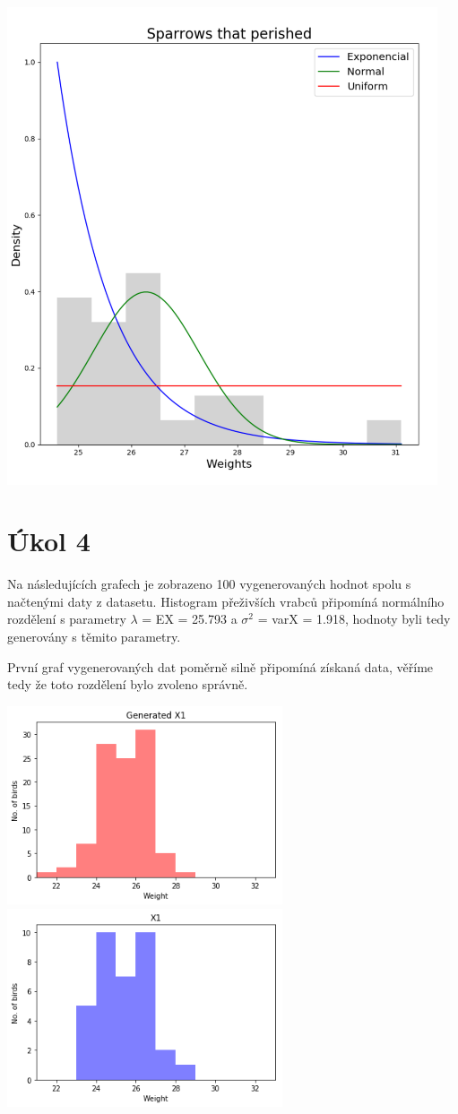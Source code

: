 \documentclass[12pt,a4paper]{article}
\begin{document}
\begin{center}
\includegraphics[width=5in]{3_died}
\end{center}
\section{Úkol 4}
Na následujících grafech je zobrazeno 100 vygenerovaných hodnot spolu s načtenými daty z datasetu. Histogram přeživších vrabců připomíná normálního rozdělení s parametry $\lambda$ = EX = 25.793 a $\sigma ^2$ = varX = 1.918, hodnoty byli tedy generovány s těmito parametry. 

První graf vygenerovaných dat poměrně silně připomíná získaná data, věříme tedy že toto rozdělení bylo zvoleno správně.

\includegraphics[width=3.2in]{4_Survived_Gen}
\includegraphics[width=3.2in]{4_Survived_Data}
\end{document}
